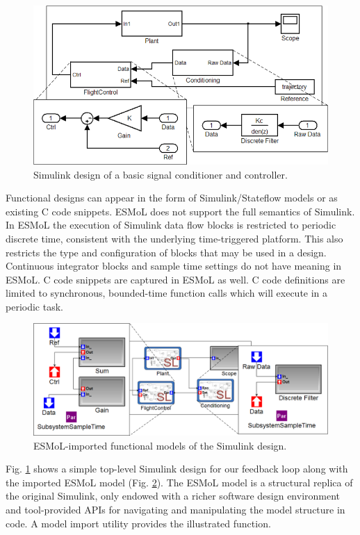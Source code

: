 \begin{figure}
	\centering
   \includegraphics[width=0.65\columnwidth]{diagrams/sl_design.png}
   \caption{Simulink design of a basic signal conditioner and controller.}
   \label{fig:sl_design}
\end{figure}

Functional designs can appear in the form of Simulink/Stateflow models or as existing C code snippets.  ESMoL does not support the full semantics of Simulink. In ESMoL the execution of Simulink data flow blocks is restricted to periodic discrete time, consistent with the underlying time-triggered platform.  This also restricts the type and configuration of blocks that may be used in a design.  Continuous integrator blocks and sample time settings do not have meaning in ESMoL.  C code snippets are captured in ESMoL as well.  C code definitions are limited to synchronous, bounded-time function calls which will execute in a periodic task.

\begin{figure}
	\centering
   \includegraphics[width=0.9\columnwidth]{diagrams/esmol_design.png}
   \caption{ESMoL-imported functional models of the Simulink design.}
   \label{fig:esmol_design}
\end{figure}

Fig. \ref{fig:sl_design} shows a simple top-level Simulink design for our feedback loop along with the imported ESMoL model (Fig. \ref{fig:esmol_design}).  The ESMoL model is a structural replica of the original Simulink, only endowed with a richer software design environment and tool-provided APIs for navigating and manipulating the model structure in code.  A model import utility provides the illustrated function.

